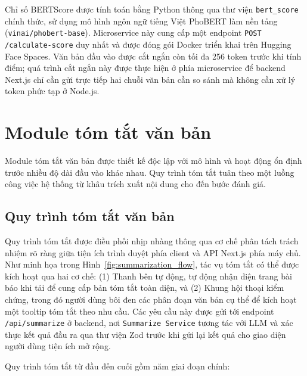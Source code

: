 Chỉ số BERTScore được tính toán bằng Python thông qua thư viện \texttt{bert\_score} chính thức, 
sử dụng mô hình ngôn ngữ tiếng Việt PhoBERT làm nền tảng (\texttt{vinai/}\allowbreak\texttt{phobert-}\allowbreak\texttt{base}). Microservice này cung cấp một 
endpoint \texttt{POST} \texttt{/calculate-score} duy nhất và được đóng gói Docker triển khai trên Hugging Face Spaces. 
Văn bản đầu vào được cắt ngắn còn tối đa 256 token trước khi tính điểm; quá trình cắt ngắn này được thực hiện ở phía microservice 
để backend Next.js chỉ cần gửi trực tiếp hai chuỗi văn bản cần so sánh mà không cần xử lý token phức tạp ở Node.js.

\section{Module tóm tắt văn bản}

Module tóm tắt văn bản được thiết kế độc lập với mô hình và hoạt động ổn định trước nhiều độ dài đầu vào khác nhau. 
Quy trình tóm tắt tuân theo một luồng công việc hệ thống từ khâu trích xuất nội dung cho đến bước đánh giá.

\subsection{Quy trình tóm tắt văn bản}

Quy trình tóm tắt được điều phối nhịp nhàng thông qua cơ chế phân tách trách nhiệm rõ ràng 
giữa tiện ích trình duyệt phía client và API Next.js phía máy chủ. 
Như minh họa trong Hình~\ref{fig:summarization_flow}, tác vụ tóm tắt có thể được kích hoạt qua hai cơ chế: 
(1) Thanh bên tự động, tự động nhận diện trang bài báo khi tải để cung cấp bản tóm tắt toàn diện, 
và (2) Khung hội thoại kiểm chứng, trong đó người dùng bôi đen các phân đoạn văn bản cụ thể để kích hoạt một tooltip tóm tắt theo nhu cầu. 
Các yêu cầu này được gửi tới endpoint \texttt{/api/summarize} ở backend, nơi \texttt{Summarize Service} tương tác với LLM và xác thực kết quả đầu ra qua thư viện Zod trước khi gửi lại kết quả cho giao diện người dùng tiện ích mở rộng.

Quy trình tóm tắt từ đầu đến cuối gồm năm giai đoạn chính:

